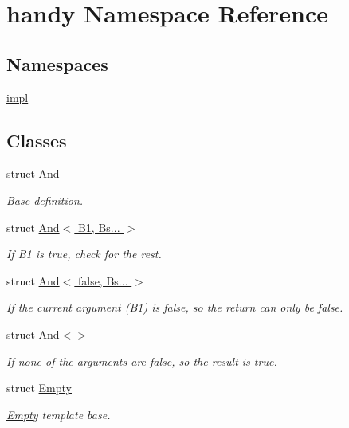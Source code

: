 \hypertarget{namespacehandy}{}\section{handy Namespace Reference}
\label{namespacehandy}
\subsection*{Namespaces}
\begin{DoxyCompactItemize}
\item 
 \hyperlink{namespacehandy_1_1impl}{impl}
\end{DoxyCompactItemize}
\subsection*{Classes}
\begin{DoxyCompactItemize}
\item 
struct \hyperlink{structhandy_1_1And}{And}
\begin{DoxyCompactList}\small\item\em Base definition. \end{DoxyCompactList}\item 
struct \hyperlink{structhandy_1_1And_3_01B1_00_01Bs_8_8_8_01_4}{And$<$ B1, Bs... $>$}
\begin{DoxyCompactList}\small\item\em If {\ttfamily B1} is true, check for the rest. \end{DoxyCompactList}\item 
struct \hyperlink{structhandy_1_1And_3_01false_00_01Bs_8_8_8_01_4}{And$<$ false, Bs... $>$}
\begin{DoxyCompactList}\small\item\em If the current argument ({\ttfamily B1}) is {\ttfamily false}, so the return can only be {\ttfamily false}. \end{DoxyCompactList}\item 
struct \hyperlink{structhandy_1_1And_3_4}{And$<$$>$}
\begin{DoxyCompactList}\small\item\em If none of the arguments are {\ttfamily false}, so the result is {\ttfamily true}. \end{DoxyCompactList}\item 
struct \hyperlink{structhandy_1_1Empty}{Empty}
\begin{DoxyCompactList}\small\item\em \hyperlink{structhandy_1_1Empty}{Empty} template base. \end{DoxyCompactList}\item 

\end{DoxyCompactItemize}
